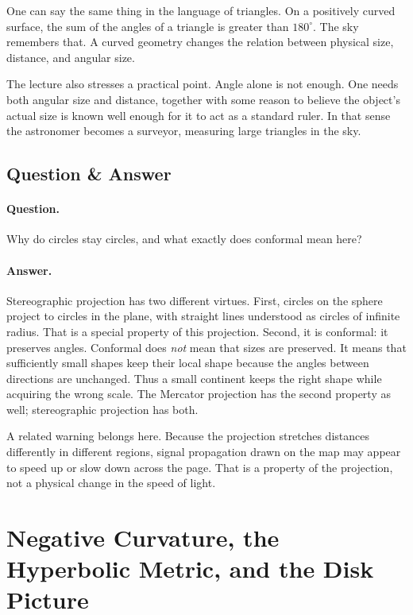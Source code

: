 One can say the same thing in the language of triangles. On a positively curved surface, the sum of the angles of a triangle is greater than \(180^\circ\). The sky remembers that. A curved geometry changes the relation between physical size, distance, and angular size.

The lecture also stresses a practical point. Angle alone is not enough. One needs both angular size and distance, together with some reason to believe the object's actual size is known well enough for it to act as a standard ruler. In that sense the astronomer becomes a surveyor, measuring large triangles in the sky.

\subsection{Question \& Answer}

\paragraph{Question.} Why do circles stay circles, and what exactly does conformal mean here?

\paragraph{Answer.} Stereographic projection has two different virtues. First, circles on the sphere project to circles in the plane, with straight lines understood as circles of infinite radius. That is a special property of this projection. Second, it is conformal: it preserves angles. Conformal does \emph{not} mean that sizes are preserved. It means that sufficiently small shapes keep their local shape because the angles between directions are unchanged. Thus a small continent keeps the right shape while acquiring the wrong scale. The Mercator projection has the second property as well; stereographic projection has both.

A related warning belongs here. Because the projection stretches distances differently in different regions, signal propagation drawn on the map may appear to speed up or slow down across the page. That is a property of the projection, not a physical change in the speed of light.

\section{Negative Curvature, the Hyperbolic Metric, and the Disk Picture}

